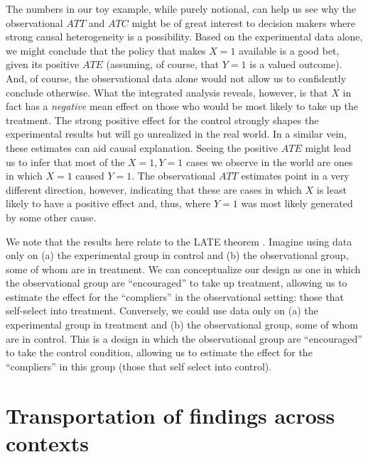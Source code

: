 \documentclass[
  12pt,
]{book}
\begin{document}
The numbers in our toy example, while purely notional, can help us see why the observational \(ATT\) and \(ATC\) might be of great interest to decision makers where strong causal heterogeneity is a possibility. Based on the experimental data alone, we might conclude that the policy that makes \(X=1\) available is a good bet, given its positive \(ATE\) (assuming, of course, that \(Y=1\) is a valued outcome). And, of course, the observational data alone would not allow us to confidently conclude otherwise. What the integrated analysis reveals, however, is that \(X\) in fact has a \emph{negative} mean effect on those who would be most likely to take up the treatment. The strong positive effect for the control strongly shapes the experimental results but will go unrealized in the real world.
In a similar vein, these estimates can aid causal explanation. Seeing the positive \(ATE\) might lead us to infer that most of the \(X=1, Y=1\) cases we observe in the world are ones in which \(X=1\) caused \(Y=1\). The observational \(ATT\) estimates point in a very different direction, however, indicating that these are cases in which \(X\) is least likely to have a positive effect and, thus, where \(Y=1\) was most likely generated by some other cause.

We note that the results here relate to the LATE theorem \citep{angrist1995identification}. Imagine using data only on (a) the experimental group in control and (b) the observational group, some of whom are in treatment. We can conceptualize our design as one in which the observational group are ``encouraged'' to take up treatment, allowing us to estimate the effect for the ``compliers'' in the observational setting: those that self-select into treatment. Conversely, we could use data only on (a) the experimental group in treatment and (b) the observational group, some of whom are in control. This is a design in which the observational group are ``encouraged'' to take the control condition, allowing us to estimate the effect for the ``compliers'' in this group (those that self select into control).

\hypertarget{transportation-of-findings-across-contexts}{%
\section{Transportation of findings across contexts}\label{transportation-of-findings-across-contexts}}
\end{document}
